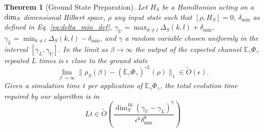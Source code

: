 \documentclass{article}
\newtheorem{theorem}{Theorem}
\newcommand{\norm}[1]{\| #1 \|}
\newcommand{\EE}{\mathbb{E}}
\begin{document}
\begin{theorem}[Ground State Preparation] \label{thm:ground_state}
    Let $H_S$ be a Hamiltonian acting on a ${\rm dim}_S$ dimensional Hilbert space, $\rho$ any input state such that $[\rho, H_S] = 0$, $\delta_{\min}$ as defined in Eq. \eqref{eq:delta_min_def}, $\gamma_U = \max_{k \neq l} \Delta_S(k, l) + \delta_{\min}$, $\gamma_L = \min_{k \neq l} \Delta_S(k,l) - \delta_{\min}$, and $\gamma$ a random variable chosen uniformly in the interval $[\gamma_L, \gamma_U]$. In the limit as $\beta \to \infty$ the output of the expected channel $\EE_\gamma \Phi_\gamma$ repeated $L$ times is $\epsilon$ close to the ground state
    \begin{equation}
        \lim_{\beta \to \infty} \norm{\rho_S(\beta) - (\EE_\gamma \Phi_\gamma)^{\circ L} (\rho)}_1 \in \widetilde{O}(\epsilon).
    \end{equation}
    Given a simulation time $t$ per application of $\EE_\gamma \Phi_{\gamma}$, the total evolution time required by our algorithm is in
    \begin{equation}
        Lt \in \widetilde{O}\left( \frac{\dim_S^{16} (\gamma_U - \gamma_L)^7}{\epsilon^{6} \delta_{\min}^8} \right)
    \end{equation}
\end{theorem}
\end{document}

